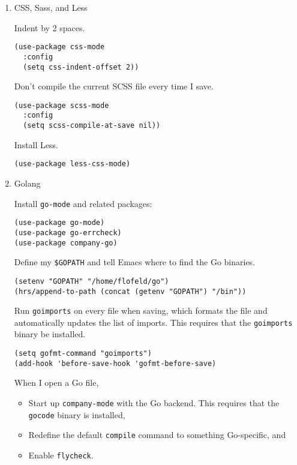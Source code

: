 \documentclass{article}
\begin{document}
\begin{enumerate}
\item CSS, Sass, and Less
\label{sec:org0d87fd8}

Indent by 2 spaces.

\begin{verbatim}
(use-package css-mode
  :config
  (setq css-indent-offset 2))
\end{verbatim}

Don't compile the current SCSS file every time I save.

\begin{verbatim}
(use-package scss-mode
  :config
  (setq scss-compile-at-save nil))
\end{verbatim}

Install Less.

\begin{verbatim}
(use-package less-css-mode)
\end{verbatim}

\item Golang
\label{sec:org0ba394e}

Install \texttt{go-mode} and related packages:

\begin{verbatim}
(use-package go-mode)
(use-package go-errcheck)
(use-package company-go)
\end{verbatim}

Define my \texttt{\$GOPATH} and tell Emacs where to find the Go binaries.

\begin{verbatim}
(setenv "GOPATH" "/home/flofeld/go")
(hrs/append-to-path (concat (getenv "GOPATH") "/bin"))
\end{verbatim}

Run \texttt{goimports} on every file when saving, which formats the file and
automatically updates the list of imports. This requires that the \texttt{goimports}
binary be installed.

\begin{verbatim}
(setq gofmt-command "goimports")
(add-hook 'before-save-hook 'gofmt-before-save)
\end{verbatim}

When I open a Go file,

\begin{itemize}
\item Start up \texttt{company-mode} with the Go backend. This requires that the \texttt{gocode}
binary is installed,
\item Redefine the default \texttt{compile} command to something Go-specific, and
\item Enable \texttt{flycheck}.
\end{itemize}


\end{enumerate}
\end{document}
